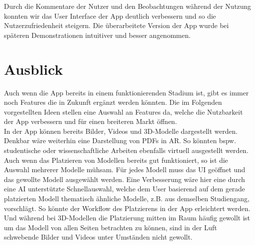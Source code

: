 \documentclass[titlepage, a4paper, 11pt]{scrartcl}
\begin{document}
        Durch die Kommentare der Nutzer und den Beobachtungen während der Nutzung konnten wir das User Interface der App deutlich verbessern und so die Nutzerzufriedenheit steigern. Die überarbeitete Version der App wurde bei späteren Demonstrationen intuitiver und besser angenommen.
      

      \section{Ausblick}
        Auch wenn die App bereits in einem funktionierenden Stadium ist, gibt es immer noch Features die in Zukunft ergänzt werden könnten. 
        Die im Folgenden vorgestellten Ideen stellen eine Auswahl an Features da, welche die Nutzbarkeit der App verbessern und für einen breiteren Markt öffnen.\\
        In der App können bereits Bilder, Videos und 3D-Modelle dargestellt werden. Denkbar wäre weiterhin eine Darstellung von PDFs in AR. 
        So könnten bspw. studentische oder wissenschaftliche Arbeiten ebenfalls virtuell ausgestellt werden.\\
        Auch wenn das Platzieren von Modellen bereits gut funktioniert, so ist die Auswahl mehrerer Modelle mühsam. 
        Für jedes Modell muss das UI geöffnet und das gewollte Modell ausgewählt werden. 
        Eine Verbesserung wäre hier eine durch eine AI unterstützte Schnellauswahl, welche dem User basierend auf dem gerade platzierten Modell thematisch ähnliche Modelle, z.B. aus demselben Studiengang, vorschlägt. 
        So könnte der Workflow des Platzierens in der App erleichtert werden.\\
        Und während bei 3D-Modellen die Platzierung mitten im Raum häufig gewollt ist um das Modell von allen Seiten betrachten zu können, sind in der Luft schwebende Bilder und Videos unter Umständen nicht gewollt. 
\end{document}

